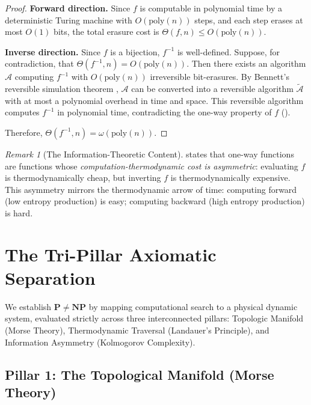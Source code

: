 \documentclass[12pt, a4paper]{article}
\newcommand{\Pc}{\mathbf{P}}
\newcommand{\NPc}{\mathbf{NP}}
\newcommand{\poly}{\text{poly}}
\theoremstyle{plain}
\theoremstyle{definition}
\theoremstyle{remark}
\newtheorem{remark}[theorem]{Remark}
\begin{document}
\begin{proof}
  \textbf{Forward direction.} Since $f$ is computable in polynomial time
  by a deterministic Turing machine with $O(\poly(n))$ steps, and each
  step erases at most $O(1)$ bits, the total erasure cost is
  $\Theta(f, n) \leq O(\poly(n))$.

  \textbf{Inverse direction.} Since $f$ is a bijection, $f^{-1}$ is
  well-defined. Suppose, for contradiction, that $\Theta(f^{-1}, n) = O(\poly(n))$.
  Then there exists an algorithm $\mathcal{A}$ computing $f^{-1}$
  with $O(\poly(n))$ irreversible bit-erasures. By Bennett's
  reversible simulation theorem \citep{Bennett1973}, $\mathcal{A}$ can
  be converted into a reversible algorithm $\widetilde{\mathcal{A}}$ with
  at most a polynomial overhead in time and space. This reversible
  algorithm computes $f^{-1}$ in polynomial time, contradicting the
  one-way property of $f$ ().

  Therefore, $\Theta(f^{-1}, n) = \omega(\poly(n))$.
\end{proof}

\begin{remark}[The Information-Theoretic Content]
   states that one-way functions are functions whose
  \emph{computation-thermodynamic cost is asymmetric}: evaluating $f$ is
  thermodynamically cheap, but inverting $f$ is thermodynamically expensive.
  This asymmetry mirrors the thermodynamic arrow of time: computing forward
  (low entropy production) is easy; computing backward (high entropy production)
  is hard.
\end{remark}

\section{The Tri-Pillar Axiomatic Separation}\label{sec:separation}

We establish $\Pc \neq \NPc$ by mapping computational search to a physical dynamic system, evaluated strictly across three interconnected pillars: Topologic Manifold (Morse Theory), Thermodynamic Traversal (Landauer's Principle), and Information Asymmetry (Kolmogorov Complexity).

\subsection{Pillar 1: The Topological Manifold (Morse Theory)}
\end{document}
